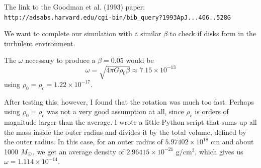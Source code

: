 \documentclass[a4paper]{tufte-handout}
\begin{document}
The link to the Goodman et al. (1993) paper:\\
{\tt http://adsabs.harvard.edu/cgi-bin/bib\_query?1993ApJ...406..528G}

We want to complete our simulation with a similar $\beta$ to check if disks form in the turbulent environment.

The $\omega$ necessary to produce a $\beta = 0.05$ would be
\begin{equation}
\omega = \sqrt{4 \pi G \rho_0 \beta} \approx 7.15\times 10^{-13}
\end{equation}
using $\rho_0 = \rho_c = 1.22\times10^{-17}$.

After testing this, however, I found that the rotation was much too fast. Perhaps using $\rho_0 = \rho_c$ was not a very good assumption at all, since $\rho_c$ is orders of magnitude larger than the average. I wrote a little Python script that sums up all the mass inside the outer radius and divides it by the total volume, defined by the outer radius. In this case, for an outer radius of $5.97402\times 10^{18}$ cm and about 1000 $M_\odot$, we get an average density of $2.96415\times 10^{-21}$ g/cm$^3$, which gives us $\omega = 1.114 \times 10^{-14}$.





\end{document}
